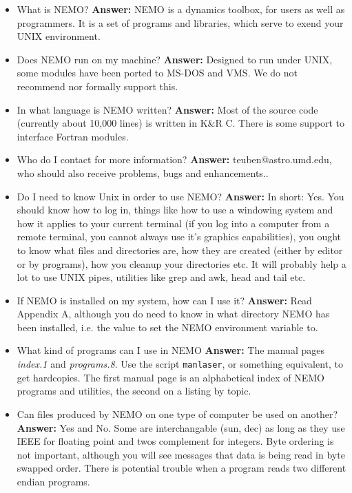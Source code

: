 \begin{itemize}
\item What is NEMO?
{\bf Answer:} NEMO is a dynamics toolbox, 
for users as well as programmers. It is a set of programs and libraries,
which serve to exend your UNIX environment.

\item Does NEMO run on my machine?
{\bf Answer:} Designed to run under UNIX, some modules have been ported to
MS-DOS and VMS. We do not recommend nor formally support this.
\item In what language is NEMO written?
{\bf Answer:} Most of the source code
(currently about 10,000 lines) is written in K\&R
C. There is some support to interface Fortran modules.

\item Who do I contact for more information?
{\bf Answer:} teuben@astro.umd.edu, who should also receive
problems, bugs and enhancements..



\item Do I need to know Unix in order to use NEMO? 
{\bf Answer:} In short: Yes.  You should know how to log in, things like
how to use a windowing system and how it applies to your current
terminal (if you log into a computer from a remote terminal, you cannot
always use it's graphics capabilities), you ought to know what files and
directories are, how they are created (either by editor or by programs),
how you cleanup your directories etc. It will probably help a lot to
use UNIX pipes, utilities like grep and awk, head and tail etc. 

\item If NEMO is installed on my system, how can I use it?
{\bf Answer:} Read Appendix A, although you do need to know
in what directory NEMO has been installed, i.e. the value
to set the NEMO environment variable to.

\item What kind of programs can I use in NEMO
{\bf Answer:} The manual pages {\it index.1} and {\it programs.8}.
Use the script {\tt manlaser}, or something equivalent,
to get hardcopies.
The first manual page is an alphabetical index of NEMO programs
and utilities, the second on a listing by topic.

\item Can files produced by NEMO on one type of
computer be used on another?
{\bf Answer:} Yes and No. Some are interchangable (sun, dec)
as long as they use IEEE for floating point and twos complement
for integers. Byte ordering is not important, although you will
see messages that data is being read in byte swapped order. There
is potential trouble when a program reads two different endian
programs.


\end{itemize}

